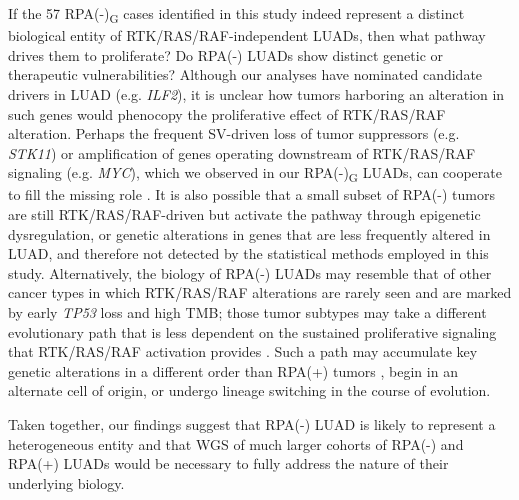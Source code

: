 \documentclass[phd,tocprelim]{cornell}
\begin{document}
If the 57 RPA(-)\textsubscript{G} cases identified in this study indeed represent a distinct biological entity of RTK/RAS/RAF-independent LUADs, then what pathway drives them to proliferate? Do RPA(-) LUADs show distinct genetic or therapeutic vulnerabilities? Although our analyses have nominated candidate drivers in LUAD (e.g. \textit{ILF2}), it is unclear how tumors harboring an alteration in such genes would phenocopy the proliferative effect of RTK/RAS/RAF alteration. Perhaps the frequent SV-driven loss of tumor suppressors (e.g. \textit{STK11}) or amplification of genes operating downstream of RTK/RAS/RAF signaling (e.g. \textit{MYC}), which we observed in our RPA(-)\textsubscript{G} LUADs, can cooperate to fill the missing role \cite{Sears2000-ua}
. It is also possible that a small subset of RPA(-) tumors are still RTK/RAS/RAF-driven but activate the pathway through epigenetic dysregulation, or genetic alterations in genes that are less frequently altered in LUAD, and therefore not detected by the statistical methods employed in this study. Alternatively, the biology of RPA(-) LUADs may resemble that of other cancer types in which RTK/RAS/RAF alterations are rarely seen and are marked by early \textit{TP53} loss and high TMB; those tumor subtypes may take a different evolutionary path that is less dependent on the sustained proliferative signaling that RTK/RAS/RAF activation provides \cite{Chen2019-bi,Drosten2014-el,Salgueiro2020-xg}. Such a path may accumulate key genetic alterations in a different order than RPA(+) tumors \cite{Lee2019-nm}, begin in an alternate cell of origin, or undergo lineage switching in the course of evolution.

Taken together, our findings suggest that RPA(-) LUAD is likely to represent a heterogeneous entity and that WGS of much larger cohorts of RPA(-) and RPA(+) LUADs would be necessary to fully address the nature of their underlying biology.

\end{document}
